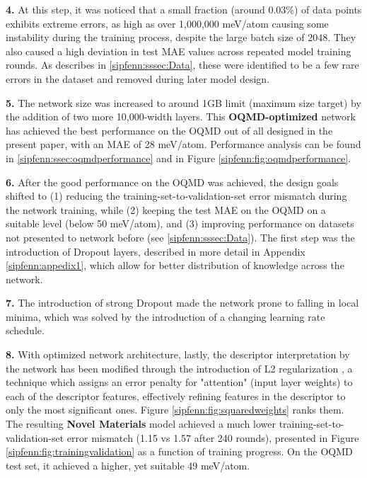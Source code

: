 \textbf{4. }At this step, it was noticed that a small fraction (around 0.03\%) of data points exhibits extreme errors, as high as over 1,000,000 meV/atom causing some instability during the training process, despite the large batch size of 2048. They also caused a high deviation in test MAE values across repeated model training rounds. As describes in \ref{sipfenn:sssec:Data}, these were identified to be a few rare errors in the dataset and removed during later model design. 

\textbf{5. }The network size was increased to around 1GB limit (maximum size target) by the addition of two more 10,000-width layers. This \textbf{OQMD-optimized} network has achieved the best performance on the OQMD out of all designed in the present paper, with an MAE of 28 meV/atom. Performance analysis can be found in \ref{sipfenn:ssec:oqmdperformance} and in Figure \ref{sipfenn:fig:oqmdperformance}.

\textbf{6. }After the good performance on the OQMD was achieved, the design goals shifted to (1) reducing the training-set-to-validation-set error mismatch during the network training, while (2) keeping the test MAE on the OQMD on a suitable level (below 50 meV/atom), and (3) improving performance on datasets not presented to network before (see \ref{sipfenn:sssec:Data}). The first step was the introduction of Dropout layers\cite{srivastava2014dropout}, described in more detail in Appendix \ref{sipfenn:appedix1}, which allow for better distribution of knowledge across the network.

\textbf{7. }The introduction of strong Dropout\cite{srivastava2014dropout} made the network prone to falling in local minima, which was solved by the introduction of a changing learning rate schedule.

\textbf{8. }With optimized network architecture, lastly, the descriptor interpretation by the network has been modified through the introduction of L2 regularization \cite{L2Regularization}, a technique which assigns an error penalty for "attention" (input layer weights) to each of the descriptor features, effectively refining features in the descriptor to only the most significant ones. Figure \ref{sipfenn:fig:squaredweights} ranks them. The resulting \textbf{Novel Materials} model achieved a much lower training-set-to-validation-set error mismatch (1.15 vs 1.57 after 240 rounds), presented in Figure \ref{sipfenn:fig:trainingvalidation} as a function of training progress. On the OQMD test set, it achieved a higher, yet suitable 49 meV/atom.


